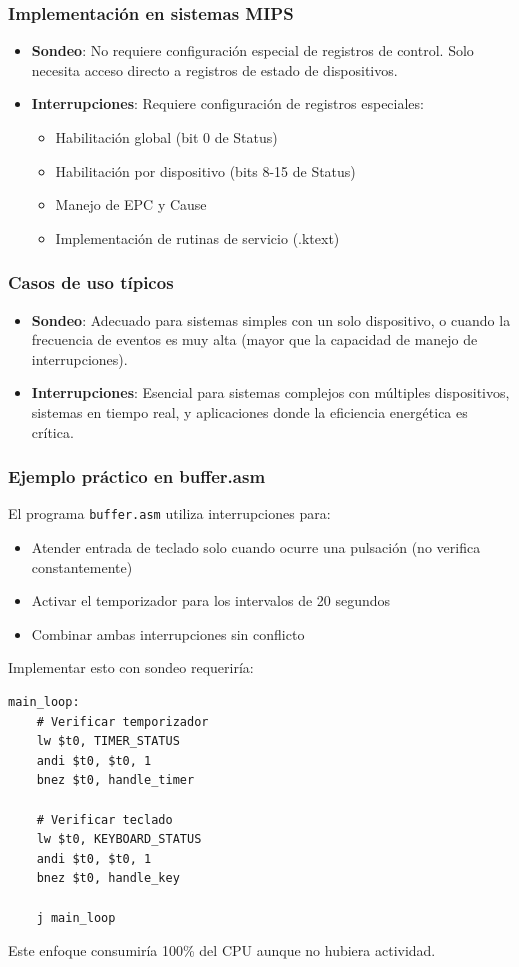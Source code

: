 \documentclass[12pt]{article}
\begin{document}
\subsubsection*{Implementación en sistemas MIPS}
\begin{itemize}
    \item \textbf{Sondeo}: No requiere configuración especial de registros de control. Solo necesita acceso directo a registros de estado de dispositivos.
    
    \item \textbf{Interrupciones}: Requiere configuración de registros especiales:
    \begin{itemize}
        \item Habilitación global (bit 0 de Status)
        \item Habilitación por dispositivo (bits 8-15 de Status)
        \item Manejo de EPC y Cause
        \item Implementación de rutinas de servicio (.ktext)
    \end{itemize}
\end{itemize}

\subsubsection*{Casos de uso típicos}
\begin{itemize}
    \item \textbf{Sondeo}: Adecuado para sistemas simples con un solo dispositivo, o cuando la frecuencia de eventos es muy alta (mayor que la capacidad de manejo de interrupciones).
    
    \item \textbf{Interrupciones}: Esencial para sistemas complejos con múltiples dispositivos, sistemas en tiempo real, y aplicaciones donde la eficiencia energética es crítica.
\end{itemize}

\subsubsection*{Ejemplo práctico en buffer.asm}
El programa \texttt{buffer.asm} utiliza interrupciones para:
\begin{itemize}
    \item Atender entrada de teclado solo cuando ocurre una pulsación (no verifica constantemente)
    \item Activar el temporizador para los intervalos de 20 segundos
    \item Combinar ambas interrupciones sin conflicto
\end{itemize}
Implementar esto con sondeo requeriría:
\begin{lstlisting}
main_loop:
    # Verificar temporizador
    lw $t0, TIMER_STATUS
    andi $t0, $t0, 1
    bnez $t0, handle_timer
    
    # Verificar teclado
    lw $t0, KEYBOARD_STATUS
    andi $t0, $t0, 1
    bnez $t0, handle_key
    
    j main_loop
\end{lstlisting}
Este enfoque consumiría 100\% del CPU aunque no hubiera actividad.
\end{document}
